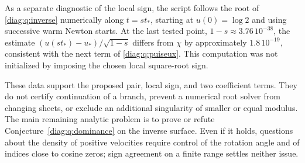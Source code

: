 As a separate diagnostic of the local sign, the script follows the root
of \eqref{diag:q:inverse} numerically along $t=s t_*$, starting at
$u(0)=\log2$ and using successive warm Newton starts.  At the last tested
point, $1-s\approx3.76\,10^{-38}$, the estimate
$(u(s t_*)-u_*)/\sqrt{1-s}$ differs from $\chi$ by approximately
$1.8\,10^{-19}$, consistent with the next term of
\eqref{diag:q:puiseux}.  This computation was not initialized by imposing
the chosen local square-root sign.

These data support the proposed pair, local sign, and two coefficient
terms.  They do not certify continuation of a branch, prevent a numerical
root solver from changing sheets, or exclude an additional singularity of
smaller or equal modulus.  The main remaining analytic problem is to
prove or refute Conjecture~\ref{diag:q:dominance} on the inverse surface.
Even if it holds, questions about the density of positive velocities
require control of the rotation angle and of indices close to cosine
zeros; sign agreement on a finite range settles neither issue.
